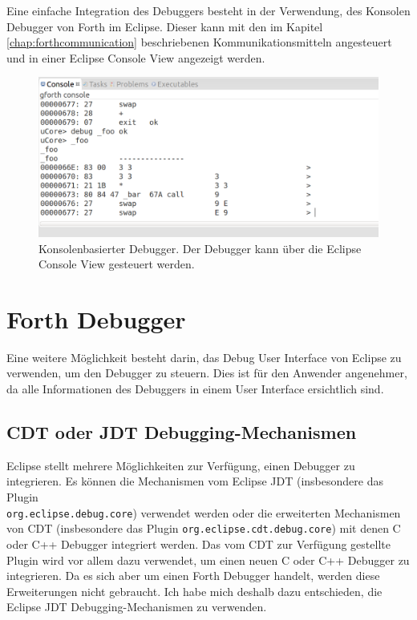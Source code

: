 Eine einfache Integration des Debuggers besteht in der Verwendung, des Konsolen Debugger von Forth im Eclipse. Dieser kann mit den im Kapitel \ref{chap:forthcommunication} beschriebenen Kommunikationsmitteln angesteuert und in einer Eclipse Console View angezeigt werden.

\begin{figure}[H]
	\centering
		\includegraphics[scale=0.35]{debugger/consoledebugger.png}
		\caption{Konsolenbasierter Debugger. Der Debugger kann über die Eclipse Console View gesteuert werden.}
		\label{fig:consoledebugger}
\end{figure}

\section{Forth Debugger}

Eine weitere Möglichkeit besteht darin, das Debug User Interface von Eclipse zu verwenden, um den Debugger zu steuern. Dies ist für den Anwender angenehmer, da alle Informationen des Debuggers in einem User Interface ersichtlich sind.

\subsection{CDT oder JDT Debugging-Mechanismen}

Eclipse stellt mehrere Möglichkeiten zur Verfügung, einen Debugger zu integrieren. Es können die Mechanismen vom Eclipse JDT (insbesondere das Plugin \\ \verb!org.eclipse.debug.core!) verwendet werden oder die erweiterten Mechanismen von CDT (insbesondere das Plugin \verb!org.eclipse.cdt.debug.core!) mit denen C oder C++ Debugger integriert werden. Das vom CDT zur Verfügung gestellte Plugin wird vor allem dazu verwendet, um einen neuen C oder C++ Debugger zu integrieren. Da es sich aber um einen Forth Debugger handelt, werden diese Erweiterungen nicht gebraucht. Ich habe mich deshalb dazu entschieden, die Eclipse JDT Debugging-Mechanismen zu verwenden.

